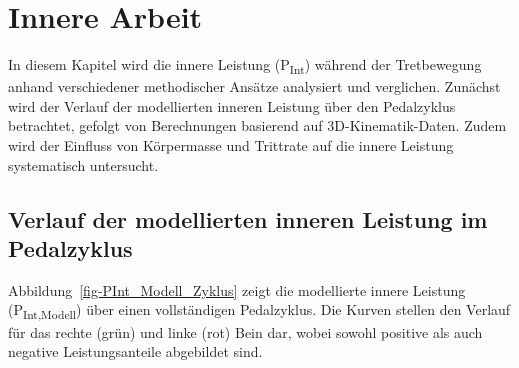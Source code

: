 \documentclass[
  letterpaper,
  DIV=11]{scrartcl}
\newenvironment{Shaded}{\begin{snugshade}}{\end{snugshade}}
\newcommand{\NormalTok}[1]{\textcolor[rgb]{0.00,0.23,0.31}{#1}}
\begin{document}
\begin{Shaded}
\end{Shaded}

\section{Innere Arbeit}\label{innere-arbeit}

In diesem Kapitel wird die innere Leistung (P\textsubscript{Int})
während der Tretbewegung anhand verschiedener methodischer Ansätze
analysiert und verglichen. Zunächst wird der Verlauf der modellierten
inneren Leistung über den Pedalzyklus betrachtet, gefolgt von
Berechnungen basierend auf 3D-Kinematik-Daten. Zudem wird der Einfluss
von Körpermasse und Trittrate auf die innere Leistung systematisch
untersucht.

\subsection{Verlauf der modellierten inneren Leistung im
Pedalzyklus}\label{verlauf-der-modellierten-inneren-leistung-im-pedalzyklus}

Abbildung~\ref{fig-PInt_Modell_Zyklus} zeigt die modellierte innere
Leistung (P\textsubscript{Int,Modell}) über einen vollständigen
Pedalzyklus. Die Kurven stellen den Verlauf für das rechte (grün) und
linke (rot) Bein dar, wobei sowohl positive als auch negative
Leistungsanteile abgebildet sind.
\end{document}
